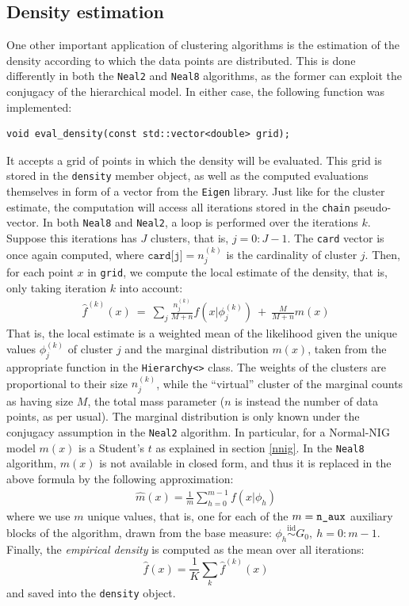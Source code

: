 \subsection{Density estimation}
One other important application of clustering algorithms is the estimation of the density according to which the data points are distributed.
This is done differently in both the \verb|Neal2| and \verb|Neal8| algorithms, as the former can exploit the conjugacy of the hierarchical model.
In either case, the following function was implemented:
\begin{verbatim}
void eval_density(const std::vector<double> grid);
\end{verbatim}
It accepts a grid of points in which the density will be evaluated.
This grid is stored in the \verb|density| member object, as well as the computed evaluations themselves in form of a vector from the \verb|Eigen| library.
Just like for the cluster estimate, the computation will access all iterations stored in the \verb|chain| pseudo-vector.
In both \verb|Neal8| and \verb|Neal2|, a loop is performed over the iterations $k$.
Suppose this iterations has $J$ clusters, that is, $j=0:J-1$.
The \verb|card| vector is once again computed, where $\texttt{card[j]} = n^{(k)}_j$ is the cardinality of cluster $j$.
Then, for each point $x$ in \verb|grid|, we compute the local estimate of the density, that is, only taking iteration $k$ into account:
\begin{equation}\label{localdens}
	\begin{aligned}
	\hat f^{(k)}(x) \ = \ \sum_j \frac{n^{(k)}_j}{M+n} f\left(x | \phi^{(k)}_j\right) \ + \ \frac{M}{M+n} m(x)
	\end{aligned}
\end{equation}
That is, the local estimate is a weighted mean of the likelihood given the unique values $\phi^{(k)}_j$ of cluster $j$ and the marginal distribution $m(x)$, taken from the appropriate function in the \verb|Hierarchy<>| class.
The weights of the clusters are proportional to their size $n^{(k)}_j$, while the ``virtual'' cluster of the marginal counts as having size $M$, the total mass parameter ($n$ is instead the number of data points, as per usual).
The marginal distribution is only known under the conjugacy assumption in the \verb|Neal2| algorithm.
In particular, for a Normal-NIG model $m(x)$ is a Student's $t$ as explained in section \ref{nnig}.
In the \verb|Neal8| algorithm, $m(x)$ is not available in closed form, and thus it is replaced in the above formula by the following approximation:
\begin{equation}\label{margneal8}
	\begin{aligned}
		\hat m(x) = \frac{1}{m} \sum_{h=0}^{m-1}  f\left(x | \phi_h\right)
	\end{aligned}
\end{equation}
where we use $m$ unique values, that is, one for each of the $m = \verb|n_aux|$ auxiliary blocks of the algorithm, drawn from the base measure: $\phi_{h} \overset{\text{iid}}{\sim} G_0, \ h=0:m-1$. \\
Finally, the \emph{empirical density} is computed as the mean over all iterations:
$$
\hat f(x) = \frac{1}{K} \sum_k \hat f^{(k)}(x)
$$
and saved into the \verb|density| object.

